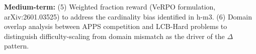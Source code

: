 \textbf{Medium-term:} (5) Weighted fraction reward (VeRPO formulation, arXiv:2601.03525) to address the cardinality bias identified in h-m3. (6) Domain overlap analysis between APPS competition and LCB-Hard problems to distinguish difficulty-scaling from domain mismatch as the driver of the $\Delta$ pattern.

